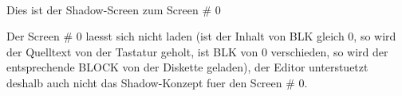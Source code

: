                                          
                                         
                                         
                                         
                                         
                                         
                                         
                                         
                                        
                                         
                                         
                                         
                                         
                                         
                                         
                                         
                                         
                                         
                                         
                                         
                                         
                                         
                                         
                                         
                                         
                                         
                                         
                                         
                                         
                                         
                                         
                                         
                                         
                                        
\\   Dies ist der Shadow-Screen          
          zum Screen # 0                 
                                         
 Der Screen # 0 laesst sich nicht laden  
  (ist der Inhalt von BLK gleich 0, so   
   wird der Quelltext von der Tastatur   
  geholt, ist BLK von 0 verschieden, so  
   wird der entsprechende BLOCK von der  
      Diskette geladen), der Editor      
  unterstuetzt deshalb auch nicht das    
  Shadow-Konzept fuer den Screen # 0.    
                                         
